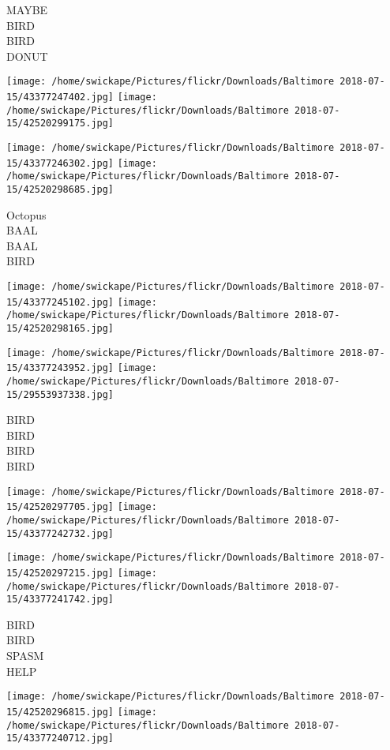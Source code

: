 \documentclass[10pt,letterpaper]{article}
\begin{document}
MAYBE\\
BIRD\\
BIRD\\
DONUT
\pagebreak

\texttt{[image: /home/swickape/Pictures/flickr/Downloads/Baltimore 2018-07-15/43377247402.jpg]}
\texttt{[image: /home/swickape/Pictures/flickr/Downloads/Baltimore 2018-07-15/42520299175.jpg]}

\texttt{[image: /home/swickape/Pictures/flickr/Downloads/Baltimore 2018-07-15/43377246302.jpg]}
\texttt{[image: /home/swickape/Pictures/flickr/Downloads/Baltimore 2018-07-15/42520298685.jpg]}

Octopus\\
BAAL\\
BAAL\\
BIRD
\pagebreak

\texttt{[image: /home/swickape/Pictures/flickr/Downloads/Baltimore 2018-07-15/43377245102.jpg]}
\texttt{[image: /home/swickape/Pictures/flickr/Downloads/Baltimore 2018-07-15/42520298165.jpg]}

\texttt{[image: /home/swickape/Pictures/flickr/Downloads/Baltimore 2018-07-15/43377243952.jpg]}
\texttt{[image: /home/swickape/Pictures/flickr/Downloads/Baltimore 2018-07-15/29553937338.jpg]}

BIRD\\
BIRD\\
BIRD\\
BIRD
\pagebreak

\texttt{[image: /home/swickape/Pictures/flickr/Downloads/Baltimore 2018-07-15/42520297705.jpg]}
\texttt{[image: /home/swickape/Pictures/flickr/Downloads/Baltimore 2018-07-15/43377242732.jpg]}

\texttt{[image: /home/swickape/Pictures/flickr/Downloads/Baltimore 2018-07-15/42520297215.jpg]}
\texttt{[image: /home/swickape/Pictures/flickr/Downloads/Baltimore 2018-07-15/43377241742.jpg]}

BIRD\\
BIRD\\
SPASM\\
HELP
\pagebreak

\texttt{[image: /home/swickape/Pictures/flickr/Downloads/Baltimore 2018-07-15/42520296815.jpg]}
\texttt{[image: /home/swickape/Pictures/flickr/Downloads/Baltimore 2018-07-15/43377240712.jpg]}
\end{document}
